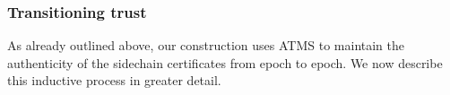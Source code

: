 



\subsubsection{Transitioning trust}
\label{sec:trust}

As already outlined above, our construction uses ATMS
to maintain the authenticity of the sidechain certificates from epoch to epoch.
We now describe this inductive process in greater detail.

